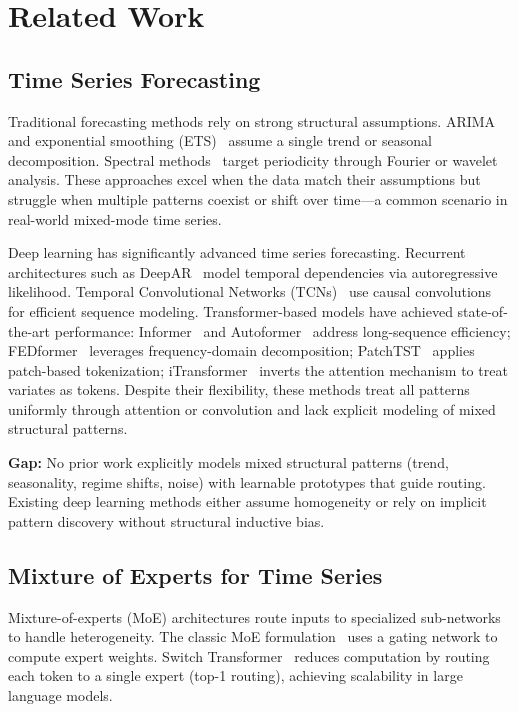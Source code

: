 \section{Related Work}

\subsection{Time Series Forecasting}

Traditional forecasting methods rely on strong structural assumptions. ARIMA~\cite{box2015time} and exponential smoothing (ETS)~\cite{hyndman2008forecasting} assume a single trend or seasonal decomposition. Spectral methods~\cite{welch1967use} target periodicity through Fourier or wavelet analysis. These approaches excel when the data match their assumptions but struggle when multiple patterns coexist or shift over time---a common scenario in real-world mixed-mode time series.

Deep learning has significantly advanced time series forecasting. Recurrent architectures such as DeepAR~\cite{salinas2019deepar} model temporal dependencies via autoregressive likelihood. Temporal Convolutional Networks (TCNs)~\cite{bai2018empirical} use causal convolutions for efficient sequence modeling. Transformer-based models have achieved state-of-the-art performance: Informer~\cite{zhou2021informer} and Autoformer~\cite{wu2021autoformer} address long-sequence efficiency; FEDformer~\cite{zhou2022fedformer} leverages frequency-domain decomposition; PatchTST~\cite{nie2022time} applies patch-based tokenization; iTransformer~\cite{liu2023itransformer} inverts the attention mechanism to treat variates as tokens. Despite their flexibility, these methods treat all patterns uniformly through attention or convolution and lack explicit modeling of mixed structural patterns.

\textbf{Gap:} No prior work explicitly models mixed structural patterns (trend, seasonality, regime shifts, noise) with learnable prototypes that guide routing. Existing deep learning methods either assume homogeneity or rely on implicit pattern discovery without structural inductive bias.

\subsection{Mixture of Experts for Time Series}

Mixture-of-experts (MoE) architectures route inputs to specialized sub-networks to handle heterogeneity. The classic MoE formulation~\cite{shazeer2017outrageously} uses a gating network to compute expert weights. Switch Transformer~\cite{fedus2022switch} reduces computation by routing each token to a single expert (top-1 routing), achieving scalability in large language models.

